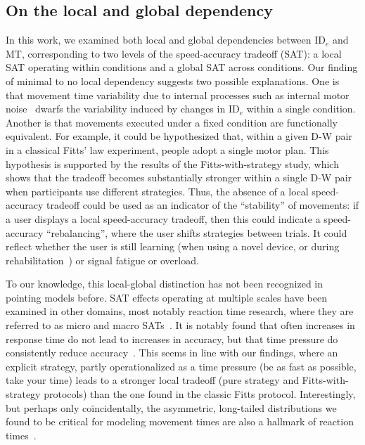 \documentclass[acmlarge, manuscript,review]{acmart}
\newcommand{\ide}{\ensuremath{{\text{ID}_e}}\xspace}
\begin{document}
\subsection{On the local and global dependency}
In this work, we examined both local and global dependencies between \ide and MT, corresponding to two levels of the speed-accuracy tradeoff (SAT): a local SAT operating within conditions and a global SAT across conditions. Our finding of minimal to no local dependency suggests two possible explanations. One is that movement time variability due to internal processes such as internal motor noise~\cite{vanbeers2004,faisal2008} dwarfs the variability induced by changes in \ide within a single condition. Another is that movements executed under a fixed condition are functionally equivalent. For example, it could be hypothesized that, within a given D-W pair in a classical Fitts' law experiment, people adopt a single motor plan. This hypothesis is supported by the results of the Fitts-with-strategy study, which shows that the tradeoff becomes substantially stronger within a single D-W pair when participants use different strategies.
Thus, the absence of a local speed-accuracy tradeoff could be used as an indicator of the ``stability'' of movements: if a user displays a local speed-accuracy tradeoff, then this could indicate a speed-accuracy ``rebalancing'', where the user shifts strategies between trials. It could reflect whether the user is still learning (\eg when using a novel device, or during rehabilitation~\cite{sungeelee2024}) or signal fatigue or overload.

To our knowledge, this local-global distinction has not been recognized in pointing models before. SAT effects operating at multiple scales have been examined in other domains, most notably reaction time research, where they are referred to as micro and macro SATs~\cite{dennis1996,domingue2022}.
It is notably found that often increases in response time do not lead to increases in accuracy, but that time pressure do consistently reduce accuracy~\cite{domingue2022}. This seems in line with our findings, where an explicit strategy, partly operationalized as a time pressure (be as fast as possible, take your time) leads to a stronger local tradeoff (pure strategy and Fitts-with-strategy protocols) than the one found in the classic Fitts protocol.
Interestingly, but perhaps only coïncidentally, the asymmetric, long-tailed distributions we found to be critical for modeling movement times are also a hallmark of reaction times~\cite{luce1991}.
\end{document}
